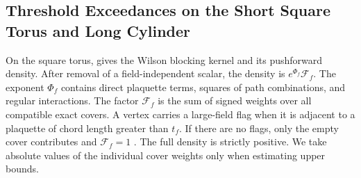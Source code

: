 \documentclass[11pt,a4paper]{article}
\numberwithin{equation}{section}
\begin{document}
\subsection{Threshold Exceedances on the Short Square Torus and Long Cylinder}

On the square torus, \cite[Definitions 5.1--5.2]{armstrong} gives the Wilson blocking kernel and its pushforward density. After removal of a field-independent scalar, the density is \(e^{\Phi_f}\mathcal F_f\). The exponent \(\Phi_f\) contains direct plaquette terms, squares of path combinations, and regular interactions. The factor \(\mathcal F_f\) is the sum of signed weights over all compatible exact covers. A vertex carries a large-field flag when it is adjacent to a plaquette of chord length greater than \(t_f\). If there are no flags, only the empty cover contributes and \(\mathcal F_f=1\) \cite[Eq.~(13.13)]{armstrong}. The full density is strictly positive. We take absolute values of the individual cover weights only when estimating upper bounds.
\end{document}
